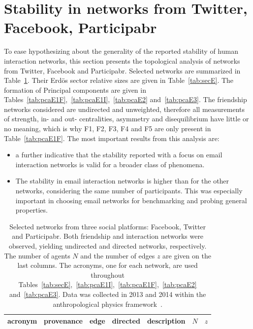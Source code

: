 \documentclass[%
 aip,
 jmp,%
 amsmath,amssymb,
 reprint,%
 floatfix,
]{revtex4-1}
\begin{document}
\FloatBarrier
\section{Stability in networks from Twitter, Facebook, Participabr}\label{si:ext}
To ease hypothesizing about the generality of the reported stability of human interaction networks,
this section presents the topological analysis of
networks from Twitter, Facebook and Participabr.
Selected networks are summarized in
Table~\ref{tab:E}. Their Erd\"os sector relative sizes are given in Table~\ref{tab:secE}. The formation of Principal components
are given in
Tables~\ref{tab:pcaE1F},~\ref{tab:pcaE1I},~\ref{tab:pcaE2} and~\ref{tab:pcaE3}. The friendship networks considered are undirected and unweighted, therefore all measurements of strength, in- and out- centralities, asymmetry and disequilibrium have little or no meaning, which is why F1, F2, F3, F4 and F5 are only present in Table~\ref{tab:pcaE1F}.
The most important results from this analysis are:

\begin{itemize}
	\item a further indicative that the stability reported with a focus on email interaction networks is valid for a broader class of phenomena.
	\item The stability in email interaction networks is higher than for the other networks, considering the same number of participants. This was especially important in choosing email networks for benchmarking and probing general properties.
\end{itemize}

\begin{table}[!h]
	\caption{Selected networks from three social platforms: Facebook, Twitter and Participabr.
	Both friendship and interaction networks were observed, yielding undirected and directed networks, respectively.
The number of agents $N$ and the number of edges $z$ are given on the last columns.
The acronyms, one for each network, are used throughout Tables~\ref{tab:secE},~\ref{tab:pcaE1I},~\ref{tab:pcaE1F},~\ref{tab:pcaE2} and~\ref{tab:pcaE3}. Data was collected in 2013 and 2014 within the anthropological physics framework~\cite{anPhy}.}
\begin{center}
\begin{tabular}{| l || c | c | c | c | c | c | }\hline
	acronym & provenance & edge & directed & description & $N$ & $z$ \\ \hline
	
\hline
\end{tabular}
\end{center}
\label{tab:E}
\end{table}
\end{document}
